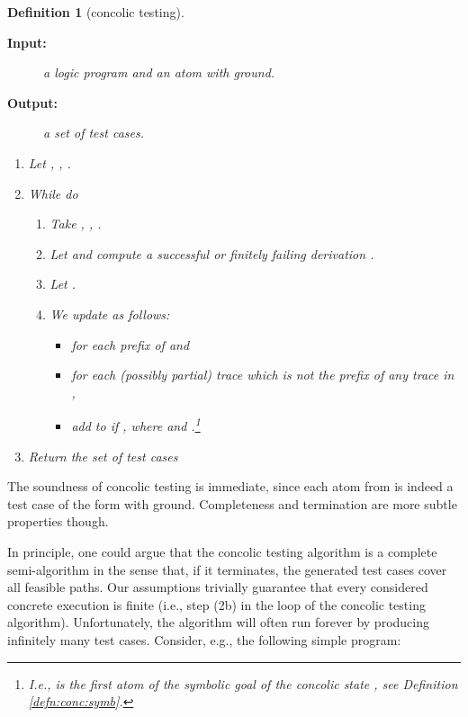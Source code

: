 \documentclass[fleqn]{tlp}
\newtheorem{definition}{Definition} \newtheorem{example}{Example} \newtheorem{lemma}{Lemma} \newtheorem{proposition}{Proposition} \newtheorem{theorem}{Theorem} \newtheorem{corollary}{Corollary}
\begin{document}
\begin{definition}[concolic testing] \label{def:concolic}
  \begin{description}
  \item[\textbf{Input:}] a logic program  and an atom
     with  ground.

  \item[\textbf{Output:}] a set  of test cases.
    
  \end{description}

  \begin{enumerate}
  \item Let , ,
    .

  \item While  do
    \begin{enumerate}
    \item Take , , .

    \item 
      Let  and 
      compute a successful or finitely failing derivation
      . 
      
    \item Let . 

    \item We update  as follows:
      \begin{itemize}
      \item for each prefix  of
         and
      \item for each (possibly partial) trace 
         which is not the prefix of
        any trace in , 
      \item add 
         to  if , where
         and
        .\!\footnote{I.e.,  is
          the first atom of the symbolic goal  of the
          concolic state , see Definition
          \ref{defn:conc:symb}. }
      \end{itemize}
    \end{enumerate}
  \item Return the set  of test cases
  \end{enumerate}
\end{definition}
The soundness of concolic testing is immediate, since 
each atom from  is indeed a test case 
of the form  with  ground. 
Completeness and termination are more subtle properties though.

In principle, one could argue that the concolic testing algorithm is
a complete semi-algorithm in the sense that, if it terminates, the
generated test cases cover all feasible paths. Our assumptions
trivially guarantee that every considered concrete execution is finite
(i.e., step (2b) in the loop of the concolic testing
algorithm). Unfortunately, the algorithm will often run forever by
producing infinitely many test cases. Consider, e.g., the following
simple program:
\end{document}

